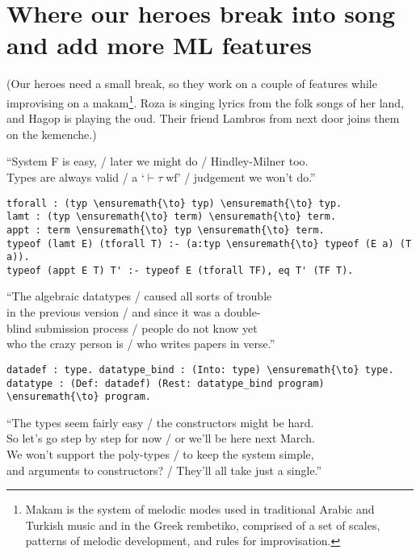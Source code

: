 \section{Where our heroes break into song and add more ML
features}\label{where-our-heroes-break-into-song-and-add-more-ml-features}

\begin{scenecomment}
(Our heroes need a small break, so they work on a couple of features while improvising on a makam\footnote{Makam is the system of melodic modes used in traditional Arabic and Turkish music and in the Greek rembetiko, comprised of a set of scales, patterns of melodic development, and rules for improvisation.}. Roza is singing lyrics from the folk songs of her land, and Hagop is playing the oud. Their friend Lambros from next door joins them on the kemenche.)
\end{scenecomment}

\begin{versy}
``System F is easy, / later we might do / Hindley-Milner too. \\
Types are always valid / a `$\vdash \tau \; \text{wf}$' / judgement we won't do.''
\end{versy}

\begin{verbatim}
tforall : (typ \ensuremath{\to} typ) \ensuremath{\to} typ.
lamt : (typ \ensuremath{\to} term) \ensuremath{\to} term.
appt : term \ensuremath{\to} typ \ensuremath{\to} term.
typeof (lamt E) (tforall T) :- (a:typ \ensuremath{\to} typeof (E a) (T a)).
typeof (appt E T) T' :- typeof E (tforall TF), eq T' (TF T).
\end{verbatim}

\begin{versy}
``The algebraic datatypes / caused all sorts of trouble \\
in the previous version / and since it was a double- \\
blind submission process / people do not know yet \\
who the crazy person is / who writes papers in verse.''
\end{versy}

\begin{verbatim}
datadef : type. datatype_bind : (Into: type) \ensuremath{\to} type.
datatype : (Def: datadef) (Rest: datatype_bind program) \ensuremath{\to} program.
\end{verbatim}

\begin{versy}
``The types seem fairly easy / the constructors might be hard. \\
So let's go step by step for now / or we'll be here next March. \\
We won't support the poly-types / to keep the system simple, \\
and arguments to constructors? / They'll all take just a single.''
\end{versy}

